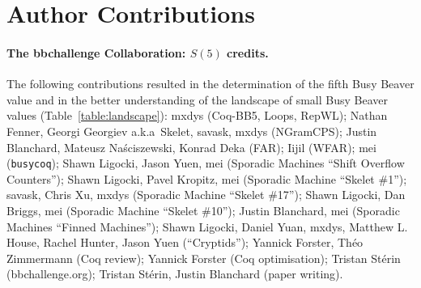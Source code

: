 \documentclass[a4paper,british]{article}
\theoremstyle{definition} %
\numberwithin{equation}{section}
\theoremstyle{definition} %
\newcommand{\CoqBB}{Coq-BB5\xspace}
\begin{document}
\appendix
{}
\newpage

\section{Author Contributions}\label{app:contribs}

\paragraph{The bbchallenge Collaboration: $S(5)$ credits.} The following contributions resulted in the determination of the fifth Busy Beaver value and in the better understanding of the landscape of small Busy Beaver values (Table~\ref{table:landscape}): mxdys (\CoqBB, Loops, RepWL); Nathan Fenner, Georgi Georgiev a.k.a~Skelet, savask, mxdys (NGramCPS); Justin Blanchard, Mateusz Naściszewski, Konrad Deka (FAR); Iijil (WFAR); mei (\texttt{busycoq}); Shawn Ligocki, Jason Yuen, mei (Sporadic Machines ``Shift Overflow Counters''); Shawn Ligocki, Pavel Kropitz, mei (Sporadic Machine ``Skelet \#1''); savask, Chris Xu, mxdys (Sporadic Machine ``Skelet \#17''); Shawn Ligocki, Dan Briggs, mei (Sporadic Machine ``Skelet \#10''); Justin Blanchard, mei (Sporadic Machines ``Finned Machines''); Shawn Ligocki, Daniel Yuan, mxdys, Matthew L. House, Rachel Hunter, Jason Yuen (``Cryptids''); Yannick Forster, Théo Zimmermann (Coq review); Yannick Forster (Coq optimisation); Tristan Stérin (bbchallenge.org); Tristan Stérin, Justin Blanchard (paper writing).
\end{document}
